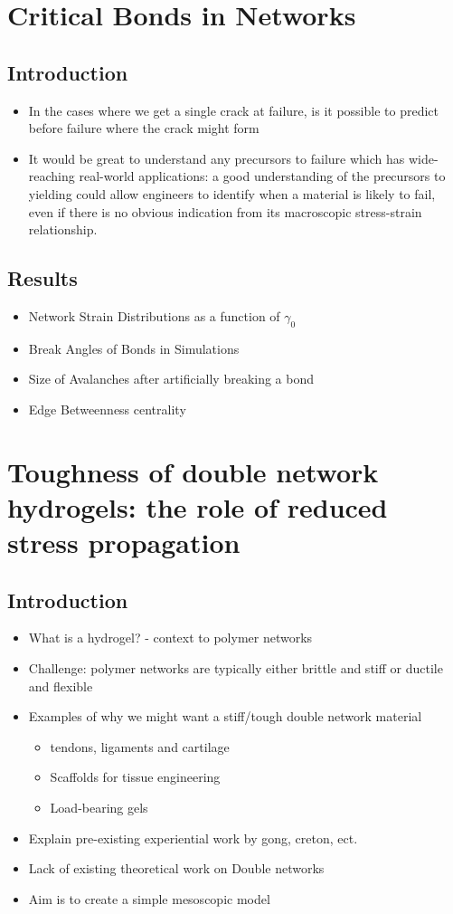 \documentclass{library/duthesis}
\begin{document}
\chapter{Critical Bonds in Networks}
\section{Introduction}
\begin{itemize}
    \item In the cases where we get a single crack at failure, is it possible to predict before failure where the crack might form
    \item It would be great to understand any precursors to failure which has wide-reaching real-world applications: a good understanding of the precursors to yielding could allow engineers to identify when a material is likely to fail, even if there is no obvious indication from its macroscopic stress-strain relationship.
\end{itemize}
\section{Results}
\begin{itemize}
    \item Network Strain Distributions as a function of $\gamma_0$
    \item Break Angles of Bonds in Simulations
    \item Size of Avalanches after artificially breaking a bond
    \item Edge Betweenness centrality
\end{itemize}



\chapter{Toughness of double network hydrogels: the role of reduced
stress propagation}
\section{Introduction}
\begin{itemize}
    \item What is a hydrogel? - context to polymer networks
    \item Challenge: polymer networks are typically either brittle and stiff or ductile and flexible
    \item Examples of why we might want a stiff/tough double network material
    \begin{itemize}
        \item tendons, ligaments and cartilage
        \item Scaffolds for tissue engineering
        \item Load-bearing gels
    \end{itemize}
    \item Explain pre-existing experiential work by gong, creton, ect. 
    \item Lack of existing theoretical work on Double networks
    \item Aim is to create a simple mesoscopic model
\end{itemize}
\end{document}

